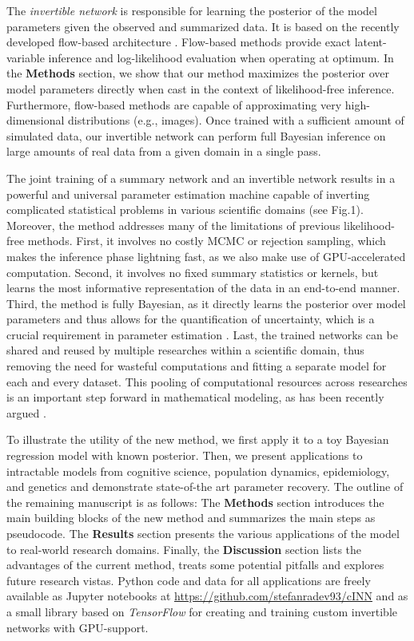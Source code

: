 \documentclass[9pt,twoside,lineno]{pnas-new}
\begin{document}
The \textit{invertible network} is responsible for learning the posterior of the model parameters given the observed and summarized data. It is based on the recently developed flow-based architecture \cite{kingma2018glow, grover2018flow, dinh2016density}. Flow-based methods provide exact latent-variable inference and log-likelihood evaluation when operating at optimum. In the \textbf{Methods} section, we show that our method maximizes the posterior over model parameters directly when cast in the context of likelihood-free inference. Furthermore, flow-based methods are capable of approximating very high-dimensional distributions (e.g., images). Once trained with a sufficient amount of simulated data, our invertible network can perform full Bayesian inference on large amounts of real data from a given domain in a single pass. 

The joint training of a summary network and an invertible network results in a powerful and universal parameter estimation machine capable of inverting complicated statistical problems in various scientific domains (see Fig.1). Moreover, the method addresses many of the limitations of previous likelihood-free methods. First, it involves no costly MCMC or rejection sampling, which makes the inference phase lightning fast, as we also make use of GPU-accelerated computation. Second, it involves no fixed summary statistics or kernels, but learns the most informative representation of the data in an end-to-end manner. Third, the method is fully Bayesian, as it directly learns the posterior over model parameters and thus allows for the quantification of uncertainty, which is a crucial requirement in parameter estimation \cite{kendall2017uncertainties, gelman2013bayesian}. Last, the trained networks can be shared and reused by multiple researches within a scientific domain, thus removing the need for wasteful computations and fitting a separate model for each and every dataset. This pooling of computational resources across researches is an important step forward in mathematical modeling, as has been recently argued \cite{mestdagh2018prepaid}.

To illustrate the utility of the new method, we first apply it to a toy Bayesian regression model with known posterior. Then, we present applications to intractable models from cognitive science, population dynamics, epidemiology, and genetics and demonstrate state-of-the art parameter recovery. The outline of the remaining manuscript is as follows: The \textbf{Methods} section introduces the main building blocks of the new method and summarizes the main steps as pseudocode. The \textbf{Results} section presents the various applications of the model to real-world research domains. Finally, the \textbf{Discussion} section lists the advantages of the current method, treats some potential pitfalls and explores future research vistas. Python code and data for all applications are freely available as Jupyter notebooks at \href{https://github.com/stefanradev93/cINN}{https://github.com/stefanradev93/cINN} and as a small library based on \textit{TensorFlow} \cite{abadi2016tensorflow} for creating and training custom invertible networks with GPU-support. 
\end{document}
